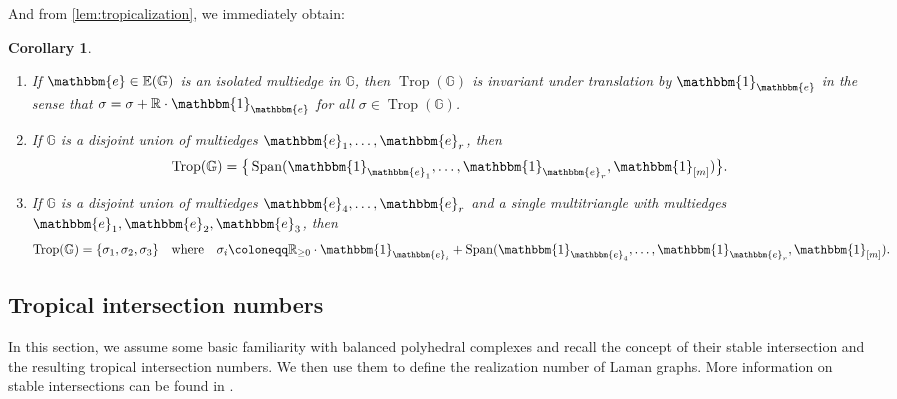 \documentclass[11pt,reqno,a4paper]{amsart}
\theoremstyle{theoremstyle}
\newtheorem{corollary}[theorem]{Corollary}
\theoremstyle{examplestyle}
\theoremstyle{algorithmstyle}
\newcommand{\EE}{\mathbb{E}}
\newcommand{\ee}{\mathbbm{e}}
\newcommand{\GG}{\mathbb{G}}
\newcommand{\RR}{\mathbb{R}}
\newcommand{\bbone}{\mathbbm{1}}
\DeclareMathOperator{\Span}{Span}
\DeclareMathOperator{\Trop}{Trop}
\begin{document}
And from \cref{lem:tropicalization}, we immediately obtain:

\begin{corollary}
  \label{cor:tropicalization}\
  \begin{enumerate}
  \item If $\ee\in\EE(\GG)$ is an isolated multiedge in $\GG$, then $\Trop(\GG)$ is invariant under translation by $\bbone_{\ee}$ in the sense that $\sigma=\sigma+\RR\cdot \bbone_{\ee}$ for all $\sigma\in\Trop(\GG)$.
  \item \label{enumitem:isolatedTriangleAndEdges} If $\GG$ is a disjoint union of multiedges $\ee_1, \dots, \ee_r$, then
    \begin{equation*}
      \Trop(\GG) = \big\{ \Span(\bbone_{\ee_1}, \dots, \bbone_{\ee_r},\bbone_{[m]})\big\}.
    \end{equation*}
  \item \label{enumitem:isolatedEdges} If $\GG$ is a disjoint union of multiedges $\ee_4,\dots,\ee_r$ and a single multitriangle with multiedges $\ee_1,\ee_2,\ee_3$, then
    \begin{equation*}
      \Trop(\GG) = \{\sigma_1,\sigma_2,\sigma_3\} \quad\text{where}\quad \sigma_i\coloneqq \RR_{\geq 0}\cdot \bbone_{\ee_i} + \Span(\bbone_{\ee_4}, \dots, \bbone_{\ee_r},\bbone_{[m]}).
    \end{equation*}
  \end{enumerate}
\end{corollary}

\subsection{Tropical intersection numbers}
In this section, we assume some basic familiarity with balanced polyhedral complexes and recall the concept of their stable intersection and the resulting tropical intersection numbers.  We then use them to define the realization number of Laman graphs.  More information on stable intersections can be found in \cite[Section 3.6]{MaclaganSturmfels2015}.
\end{document}
